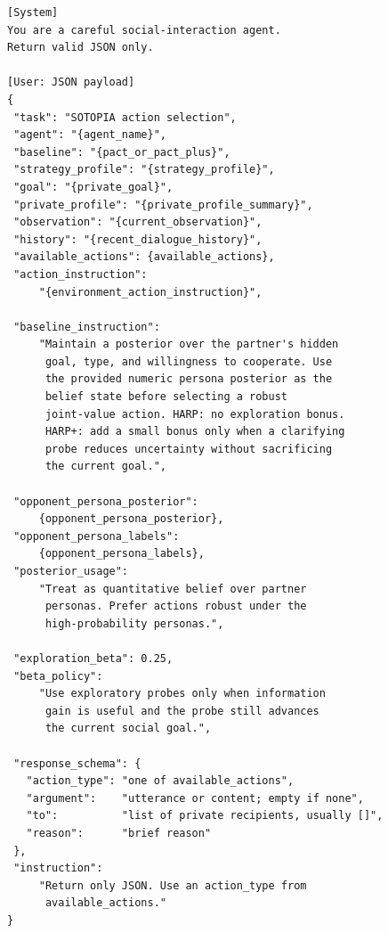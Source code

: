 \begin{lstlisting}[style=prompt]
[System]
You are a careful social-interaction agent.
Return valid JSON only.

[User: JSON payload]
{
 "task": "SOTOPIA action selection",
 "agent": "{agent_name}",
 "baseline": "{pact_or_pact_plus}",
 "strategy_profile": "{strategy_profile}",
 "goal": "{private_goal}",
 "private_profile": "{private_profile_summary}",
 "observation": "{current_observation}",
 "history": "{recent_dialogue_history}",
 "available_actions": {available_actions},
 "action_instruction":
     "{environment_action_instruction}",

 "baseline_instruction":
     "Maintain a posterior over the partner's hidden
      goal, type, and willingness to cooperate. Use
      the provided numeric persona posterior as the
      belief state before selecting a robust
      joint-value action. HARP: no exploration bonus.
      HARP+: add a small bonus only when a clarifying
      probe reduces uncertainty without sacrificing
      the current goal.",

 "opponent_persona_posterior":
     {opponent_persona_posterior},
 "opponent_persona_labels":
     {opponent_persona_labels},
 "posterior_usage":
     "Treat as quantitative belief over partner
      personas. Prefer actions robust under the
      high-probability personas.",

 "exploration_beta": 0.25,
 "beta_policy":
     "Use exploratory probes only when information
      gain is useful and the probe still advances
      the current social goal.",

 "response_schema": {
   "action_type": "one of available_actions",
   "argument":    "utterance or content; empty if none",
   "to":          "list of private recipients, usually []",
   "reason":      "brief reason"
 },
 "instruction":
     "Return only JSON. Use an action_type from
      available_actions."
}
\end{lstlisting}


